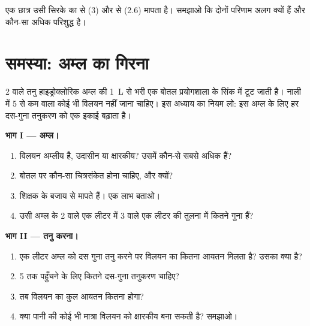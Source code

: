 \begin{exercise}[$\star\star\star$]\label{exo:g9:acids-bases-ph:12}
एक छात्र उसी सिरके का   से (3) और  से (2.6) मापता है।
समझाओ कि दोनों परिणाम अलग क्यों हैं और कौन-सा अधिक
परिशुद्ध है।
\end{exercise}

\section{समस्या: अम्ल का गिरना}

\begin{problem}
\label{pb:g9:acids-bases-ph:1}
 2 वाले तनु हाइड्रोक्लोरिक अम्ल की \qty{1}{L} से भरी एक बोतल प्रयोगशाला के
सिंक में टूट जाती है। नाली में  5 से कम वाला कोई भी विलयन नहीं जाना
चाहिए। इस अध्याय का नियम लो: इस अम्ल के लिए हर दस-गुना
तनुकरण  को एक इकाई बढ़ाता है।

\medskip
\noindent\textbf{भाग I --- अम्ल।}
\begin{enumerate}
  \item विलयन अम्लीय है, उदासीन या क्षारकीय? उसमें कौन-से  सबसे
        अधिक हैं?
  \item बोतल पर कौन-सा चित्रसंकेत होना चाहिए, और क्यों?
  \item शिक्षक  के बजाय  से  मापते हैं।
        एक लाभ बताओ।
  \item उसी अम्ल के  2 वाले एक लीटर में  3 वाले एक लीटर की तुलना में
        कितने गुना   हैं?
\end{enumerate}

\medskip
\noindent\textbf{भाग II --- तनु करना।}
\begin{enumerate}[resume]
  \item एक लीटर अम्ल को दस गुना तनु करने पर विलयन का कितना आयतन मिलता है?
        उसका  क्या है?
  \item {} 5 तक पहुँचने के लिए कितने दस-गुना तनुकरण चाहिए?
  \item तब विलयन का कुल आयतन कितना होगा?
  \item क्या पानी की कोई भी मात्रा विलयन को क्षारकीय बना सकती है? समझाओ।
\end{enumerate}


\end{problem}
